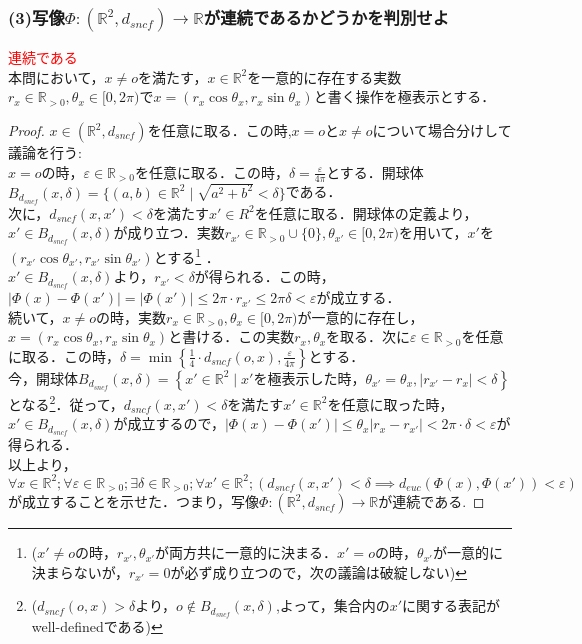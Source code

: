 \documentclass{jreport}
\newcommand{\de}{d_{euc}}
\newcommand{\ds}{d_{sncf}}
\newcommand{\bs}{B_{\ds}}
\newcommand{\R}{\mathbb{R}}
\newcommand{\Rp}{\mathbb{R}_{>0}}
\begin{document}
\subsubsection{(3)写像$\Phi : (\R^2,\ds) \to \R$が連続であるかどうかを判別せよ}
\textcolor{red}{連続である}\\
本問において，$x\neq o$を満たす，$x \in \R^2$を一意的に存在する実数$r_x \in \Rp ,\theta_x \in [0,2\pi)$で$x=(r_x\cos\theta_x,r_x\sin\theta_x)$と書く操作を極表示とする．
\begin{proof}
	$x \in (\R^2, \ds)$を任意に取る．この時,$x = o$と$x \neq o$について場合分けして議論を行う:\\
	$x = o$の時，$\varepsilon \in \Rp$を任意に取る．この時，$\delta = \frac{\varepsilon}{4 \pi}$とする．開球体$\bs(x,\delta) = \{ (a,b) \in \R^2 \mid \sqrt{a^2+b^2} < \delta  \}$である．\\
	次に，$\ds(x,x')<\delta$を満たす$x' \in R^2$を任意に取る．開球体の定義より，$x' \in \bs(x,\delta)$が成り立つ．実数$r_{x'} \in \Rp\cup\{0\} ,\theta_{x'} \in [0,2\pi)$を用いて，$x'$を$(r_{x'}\cos\theta_{x'} , r_{x'}\sin\theta_{x'})$とする\footnote{($x' \neq o$の時，$r_{x'},\theta_{x'}$が両方共に一意的に決まる．$x'=o$の時，$\theta_{x'}$が一意的に決まらないが，$r_{x'}=0$が必ず成り立つので，次の議論は破綻しない)} ．\\
	$x' \in \bs(x,\delta)$より，$r_{x'} < \delta$が得られる．この時，$|\Phi(x) -\Phi(x')| = |\Phi(x')|\le 2\pi \cdot r_{x'} \le 2\pi \delta < \varepsilon$が成立する．\\
	続いて，$x \neq o$の時，実数$r_x \in \Rp,\theta_x \in [0,2\pi)$が一意的に存在し，$x=(r_x \cos\theta_x,r_x \sin\theta_x)$と書ける．この実数$r_x,\theta_x$を取る．次に$\varepsilon \in \Rp$を任意に取る．この時，$\delta =\min\left\{ \frac{1}{4}\cdot \ds(o,x), \frac{\varepsilon}{4\pi} \right\}$とする．\\
	今，開球体$\bs(x,\delta)=\left\{ x' \in \R^2 \mid x'を極表示した時， \theta_{x'} =\theta_x, |r_{x'}-r_x|<\delta \right\}$となる\footnote{($\ds(o,x)>\delta$より，$o\notin \bs(x,\delta)$,よって，集合内の$x'$に関する表記がwell-definedである)}．従って，$\ds(x,x')<\delta$を満たす$x' \in \R^2$を任意に取った時，$x' \in \bs(x,\delta)$が成立するので，$|\Phi(x) - \Phi(x')|\le \theta_x |r_x- r_{x'}|<2\pi \cdot \delta <\varepsilon$が得られる．\\
	以上より，
	$$
	\forall x \in \R^2; \forall \varepsilon \in \Rp ; \exists \delta \in \Rp; \forall x' \in \R^2;\left( \ds(x,x')<\delta \implies \de(\Phi(x),\Phi(x'))<\varepsilon \right)
	$$
	が成立することを示せた．つまり，写像$\Phi : (\R^2,\ds) \to \R$が連続である.
\end{proof}
\newpage
\end{document}
